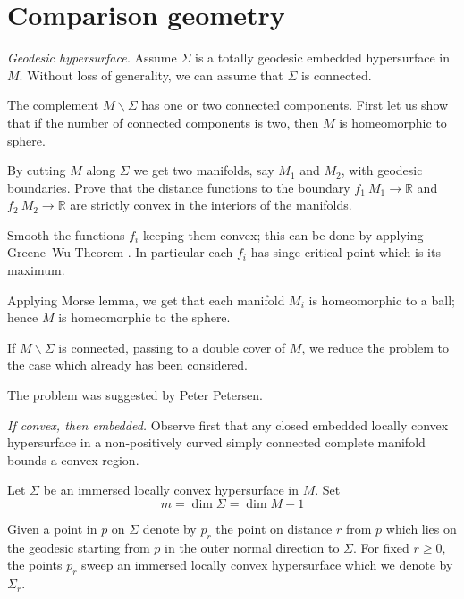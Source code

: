 \section*{Comparison geometry}



\textit{Geodesic hypersurface.}
Assume $\Sigma$ is a totally geodesic embedded hypersurface in $M$.
Without loss of generality, we can assume that $\Sigma$ is connected.

The complement $M\backslash\Sigma$ has one or two connected components.
First let us show that if the number of connected components is two, 
then $M$ is homeomorphic to sphere.

By cutting $M$ along $\Sigma$ 
we get two manifolds, say $M_1$ and $M_2$,
with geodesic boundaries. 
Prove that the distance functions to the boundary 
$f_1\:M_1\to\mathbb{R}$ and $f_2\:M_2\to\mathbb{R}$ are strictly convex in the interiors of the manifolds.

Smooth the functions $f_i$ keeping them convex; 
this can be done by applying Greene--Wu Theorem \cite[see Thm. 2 in][]{greene-wu}.
In particular each $f_i$ has singe critical point which is its maximum.

Applying Morse lemma, we get that each manifold $M_i$ is homeomorphic to a ball; 
hence $M$ 
is homeomorphic to the sphere.

If $M\backslash\Sigma$ is connected,
passing to a double cover of $M$,
we reduce the problem to the case which already has been considered.

The problem was suggested by Peter Petersen.



\textit{If convex, then embedded.}
Observe first that any closed embedded locally convex hypersurface in a non-positively curved simply connected complete manifold bounds a convex region.


Let $\Sigma$ be an immersed locally convex hypersurface in $M$.
Set 
\[m=\dim \Sigma=\dim M-1\]

Given a point in $p$ on $\Sigma$ 
denote by $p_r$ the point on distance $r$ from $p$
which lies on the geodesic starting from $p$ in the outer normal direction to $\Sigma$.
For fixed $r\ge 0$,
the points $p_r$ sweep an immersed locally convex hypersurface which we denote by $\Sigma_r$.

